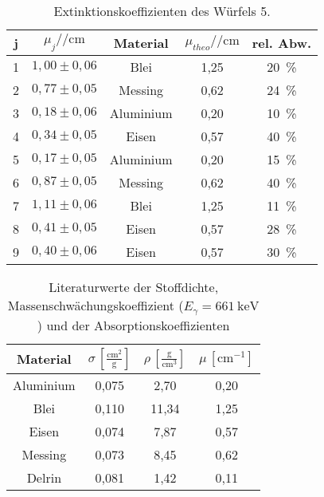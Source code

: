 \begin{table}[H]
    \centering
    \begin{tabular}{|c|c|c|c|c|}  
    \hline
    j & {$\mu_j/\si{\per\centi\meter}$} & {Material} & {$\mu_{theo}/\si{\per\centi\meter}$} & {rel. Abw.}\tabularnewline
    \hline
    1 & $1,00\pm0,06$ & {Blei} & 1,25 & {\SI{20}{\percent}}\tabularnewline
    \hline
    2 & $0,77\pm0,05$ & {Messing} & 0,62 & {\SI{24}{\percent}}\tabularnewline
    \hline
    3 & $0,18\pm0,06$ & {Aluminium} & 0,20 & {\SI{10}{\percent}}\tabularnewline
    \hline
    4 & $0,34\pm0,05$ & {Eisen} & 0,57 & {\SI{40}{\percent}}\tabularnewline
    \hline
    5 & $0,17\pm0,05$ & {Aluminium} & 0,20 & {\SI{15}{\percent}}\tabularnewline
    \hline
    6 & $0,87\pm0,05$ & {Messing} & 0,62 & {\SI{40}{\percent}}\tabularnewline
    \hline
    7 & $1,11\pm0,06$ & {Blei} & 1,25 & {\SI{11}{\percent}}\tabularnewline
    \hline
    8 & $0,41\pm0,05$ & {Eisen} & 0,57 & {\SI{28}{\percent}}\tabularnewline
    \hline
    9 & $0,40\pm0,06$ & {Eisen} & 0,57 & {\SI{30}{\percent}}\tabularnewline
    \hline
    \end{tabular}
    
    \caption{Extinktionskoeffizienten des Würfels 5.}
    \label{tab:W5}
    \end{table}
\FloatBarrier

\begin{table}[H]
    \centering
    \begin{tabular}{|c|c|c|c|}
    \hline 
    Material & $\sigma\,\left[\frac{\text{cm}^{2}}{\text{g}}\right]$ & $\rho\,\left[\frac{\text{g}}{\text{cm}^{3}}\right]$ & $\mu\,\left[\text{cm}^{-1}\right]$\tabularnewline
    \hline 
    \hline 
    Aluminium & 0,075 & 2,70 & 0,20\tabularnewline
    \hline 
    Blei & 0,110 & 11,34 & 1,25\tabularnewline
    \hline 
    Eisen & 0,074 & 7,87 & 0,57\tabularnewline
    \hline 
    Messing & 0,073 & 8,45 & 0,62\tabularnewline
    \hline 
    Delrin & 0,081 & 1,42 & 0,11\tabularnewline
    \hline 
    \end{tabular}
    \caption{Literaturwerte der Stoffdichte, Massenschwächungskoeffizient ($E_{\gamma}=\SI{661}{\kilo\electronvolt}$) und der
    Absorptionskoeffizienten \cite{Theorie}}
    \label{tab:Theo}
    \end{table}